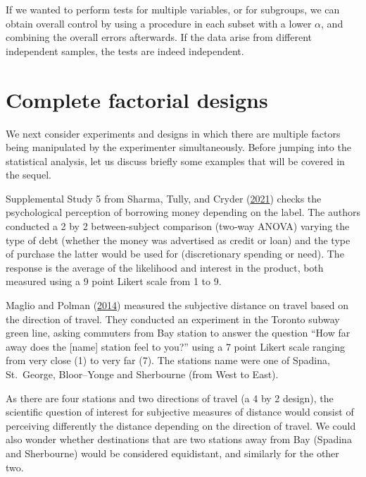 \documentclass[
  11pt,
  letterpaper,
]{scrbook}
\theoremstyle{definition}
\theoremstyle{remark}
\begin{document}
If we wanted to perform tests for multiple variables, or for subgroups,
we can obtain overall control by using a procedure in each subset with a
lower \(\alpha\), and combining the overall errors afterwards. If the
data arise from different independent samples, the tests are indeed
independent.


\hypertarget{complete-factorial-designs}{%
\chapter{Complete factorial designs}\label{complete-factorial-designs}}

We next consider experiments and designs in which there are multiple
factors being manipulated by the experimenter simultaneously. Before
jumping into the statistical analysis, let us discuss briefly some
examples that will be covered in the sequel.

Supplemental Study 5 from Sharma, Tully, and Cryder
(\protect\hyperlink{ref-Sharma.Tully.Cryder:2021}{2021}) checks the
psychological perception of borrowing money depending on the label. The
authors conducted a 2 by 2 between-subject comparison (two-way ANOVA)
varying the type of debt (whether the money was advertised as credit or
loan) and the type of purchase the latter would be used for
(discretionary spending or need). The response is the average of the
likelihood and interest in the product, both measured using a 9 point
Likert scale from 1 to 9.

Maglio and Polman (\protect\hyperlink{ref-Maglio.Polman:2014}{2014})
measured the subjective distance on travel based on the direction of
travel. They conducted an experiment in the Toronto subway green line,
asking commuters from Bay station to answer the question ``How far away
does the {[}name{]} station feel to you?'' using a 7 point Likert scale
ranging from very close (1) to very far (7). The stations name were one
of Spadina, St.~George, Bloor--Yonge and Sherbourne (from West to East).

As there are four stations and two directions of travel (a 4 by 2
design), the scientific question of interest for subjective measures of
distance would consist of perceiving differently the distance depending
on the direction of travel. We could also wonder whether destinations
that are two stations away from Bay (Spadina and Sherbourne) would be
considered equidistant, and similarly for the other two.
\end{document}
